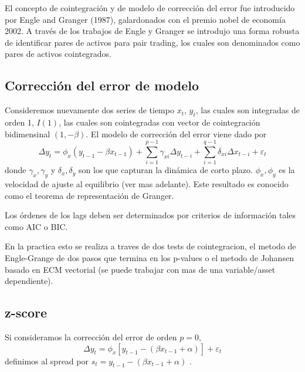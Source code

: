 \documentclass{myarticle}
\begin{document}
El concepto de cointegraci\'on y de modelo de correcci\'on del error fue introducido por Engle and Granger (1987), galardonados con el premio nobel de econom\'ia 2002. A trav\'es de los trabajos de Engle y Granger se introdujo una forma robusta de identificar pares de activos para pair trading, los cuales son denominados como pares de activos cointegrados.


\subsection{Correcci\'on del error de modelo}
\label{sec:orgb45176a}

Consideremos nuevamente dos series de tiempo \(x_t\), \(y_t\), las cuales son integradas de orden 1, \(I(1)\), las cuales son cointegradas con vector de cointegraci\'on bidimensinal \((1, -\beta)\). El modelo de correcci\'on del error viene dado por
\[
\Delta y_t = \phi_x (y_{t-1} - \beta x_{t-1}) + \sum_{i=1}^{p-1} \gamma_{xi} \Delta y_{t-i} + \sum_{i=1}^{q-1} \delta_{xi} \Delta x_{t-i} + \varepsilon_t
\]
donde \(\gamma_x,\gamma_y\) y \(\delta_x,\delta_y\) son los que capturan la din\'amica de corto plazo. \(\phi_x,\phi_y\) es la velocidad de ajuste al equilibrio (ver mas adelante).
Este resultado es conocido como el teorema de representaci\'on de Granger.


Los \'ordenes de los lags deben ser determinados por criterios de informaci\'on tales como AIC o BIC.

En la practica esto se realiza a traves de dos tests de cointegracion, el metodo de Engle-Grange de dos pasos que termina en los p-values o el metodo de Johansen basado en ECM vectorial (se puede trabajar con mas de una variable/asset dependiente).


\subsection{z-score}

Si consideramos la correcci\'on del error de orden $p=0$,  
\[
\Delta y_t = \phi_x [y_{t-1} - (\beta x_{t-1} +\alpha)] +  \varepsilon_t
\]
definimos al spread por $s_t=y_{t-1} - (\beta x_{t-1} +\alpha)$ . %
\end{document}
